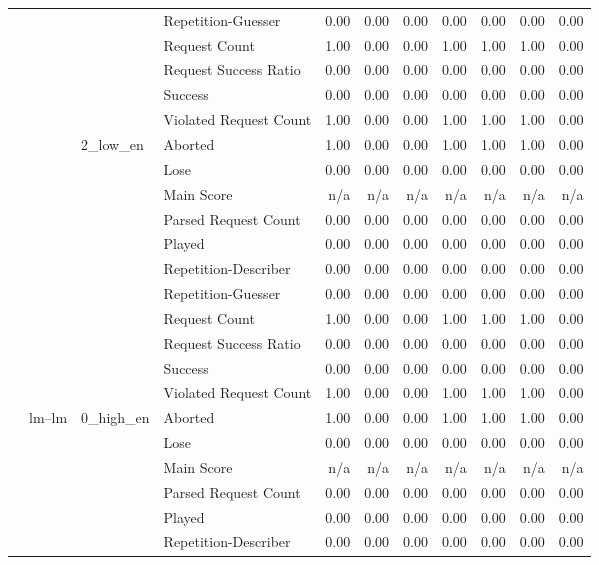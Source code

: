 \begin{tabular}{llllrrrrrrr}
 &  &  & Repetition-Guesser & 0.00 & 0.00 & 0.00 & 0.00 & 0.00 & 0.00 & 0.00 \\
 &  &  & Request Count & 1.00 & 0.00 & 0.00 & 1.00 & 1.00 & 1.00 & 0.00 \\
 &  &  & Request Success Ratio & 0.00 & 0.00 & 0.00 & 0.00 & 0.00 & 0.00 & 0.00 \\
 &  &  & Success & 0.00 & 0.00 & 0.00 & 0.00 & 0.00 & 0.00 & 0.00 \\
 &  &  & Violated Request Count & 1.00 & 0.00 & 0.00 & 1.00 & 1.00 & 1.00 & 0.00 \\
\cline{3-11}
 &  & \multirow[t]{11}{*}{2_low_en} & Aborted & 1.00 & 0.00 & 0.00 & 1.00 & 1.00 & 1.00 & 0.00 \\
 &  &  & Lose & 0.00 & 0.00 & 0.00 & 0.00 & 0.00 & 0.00 & 0.00 \\
 &  &  & Main Score & n/a & n/a & n/a & n/a & n/a & n/a & n/a \\
 &  &  & Parsed Request Count & 0.00 & 0.00 & 0.00 & 0.00 & 0.00 & 0.00 & 0.00 \\
 &  &  & Played & 0.00 & 0.00 & 0.00 & 0.00 & 0.00 & 0.00 & 0.00 \\
 &  &  & Repetition-Describer & 0.00 & 0.00 & 0.00 & 0.00 & 0.00 & 0.00 & 0.00 \\
 &  &  & Repetition-Guesser & 0.00 & 0.00 & 0.00 & 0.00 & 0.00 & 0.00 & 0.00 \\
 &  &  & Request Count & 1.00 & 0.00 & 0.00 & 1.00 & 1.00 & 1.00 & 0.00 \\
 &  &  & Request Success Ratio & 0.00 & 0.00 & 0.00 & 0.00 & 0.00 & 0.00 & 0.00 \\
 &  &  & Success & 0.00 & 0.00 & 0.00 & 0.00 & 0.00 & 0.00 & 0.00 \\
 &  &  & Violated Request Count & 1.00 & 0.00 & 0.00 & 1.00 & 1.00 & 1.00 & 0.00 \\
\cline{2-11} \cline{3-11}
 & \multirow[t]{33}{*}{lm--lm} & \multirow[t]{11}{*}{0_high_en} & Aborted & 1.00 & 0.00 & 0.00 & 1.00 & 1.00 & 1.00 & 0.00 \\
 &  &  & Lose & 0.00 & 0.00 & 0.00 & 0.00 & 0.00 & 0.00 & 0.00 \\
 &  &  & Main Score & n/a & n/a & n/a & n/a & n/a & n/a & n/a \\
 &  &  & Parsed Request Count & 0.00 & 0.00 & 0.00 & 0.00 & 0.00 & 0.00 & 0.00 \\
 &  &  & Played & 0.00 & 0.00 & 0.00 & 0.00 & 0.00 & 0.00 & 0.00 \\
 &  &  & Repetition-Describer & 0.00 & 0.00 & 0.00 & 0.00 & 0.00 & 0.00 & 0.00 \\

\end{tabular}
